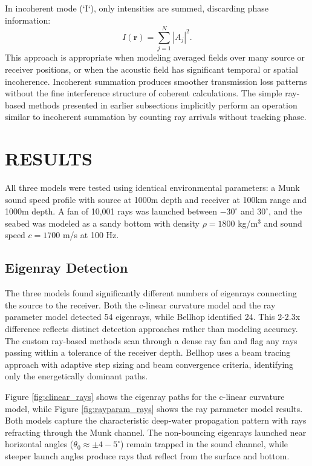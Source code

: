 \documentclass[fleqn]{jaes}
\begin{document}
In incoherent mode (`I`), only intensities are summed, discarding phase information:
\begin{equation}
I(\mathbf{r}) = \sum_{j=1}^{N} |A_j|^2.
\end{equation}
This approach is appropriate when modeling averaged fields over many source or receiver positions, or when the acoustic field has significant temporal or spatial incoherence. Incoherent summation produces smoother transmission loss patterns without the fine interference structure of coherent calculations. The simple ray-based methods presented in earlier subsections implicitly perform an operation similar to incoherent summation by counting ray arrivals without tracking phase.

\section{RESULTS}

All three models were tested using identical environmental parameters: a Munk sound speed profile with source at 1000m depth and receiver at 100km range and 1000m depth. A fan of 10,001 rays was launched between $-30^\circ$ and $30^\circ$, and the seabed was modeled as a sandy bottom with density $\rho = 1800$ kg/m$^3$ and sound speed $c = 1700$ m/s at 100 Hz.

\subsection{Eigenray Detection}

The three models found significantly different numbers of eigenrays connecting the source to the receiver. Both the c-linear curvature model and the ray parameter model detected 54 eigenrays, while Bellhop identified 24. This 2-2.3x difference reflects distinct detection approaches rather than modeling accuracy. The custom ray-based methods scan through a dense ray fan and flag any rays passing within a tolerance of the receiver depth. Bellhop uses a beam tracing approach with adaptive step sizing and beam convergence criteria, identifying only the energetically dominant paths.

Figure \ref{fig:clinear_rays} shows the eigenray paths for the c-linear curvature model, while Figure \ref{fig:rayparam_rays} shows the ray parameter model results. Both models capture the characteristic deep-water propagation pattern with rays refracting through the Munk channel. The non-bouncing eigenrays launched near horizontal angles ($\theta_0 \approx \pm 4-5^\circ$) remain trapped in the sound channel, while steeper launch angles produce rays that reflect from the surface and bottom.
\end{document}
